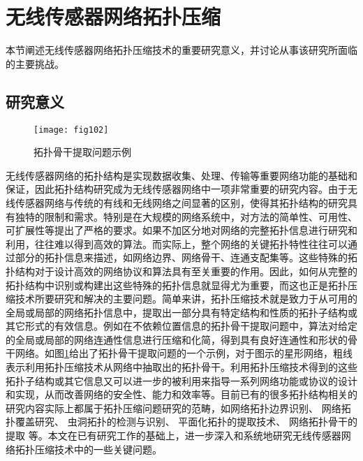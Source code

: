 \section{无线传感器网络拓扑压缩}
本节阐述无线传感器网络拓扑压缩技术的重要研究意义，并讨论从事该研究所面临的主要挑战。
\subsection{研究意义}
\begin{figure}[t]
  \centering
  \texttt{[image: fig102]}
  \caption{拓扑骨干提取问题示例}
  \label{fig:102}
\end{figure}
无线传感器网络的拓扑结构是实现数据收集、处理、传输等重要网络功能的基础和保证，因此拓扑结构研究成为无线传感器网络中一项非常重要的研究内容。由于无线传感器网络与传统的有线和无线网络之间显著的区别，使得其拓扑结构的研究具有独特的限制和需求。特别是在大规模的网络系统中，对方法的简单性、可用性、可扩展性等提出了严格的要求。如果不加区分地对网络的完整拓扑信息进行研究和利用，往往难以得到高效的算法。而实际上，整个网络的关键拓扑特性往往可以通过部分的拓扑信息来描述，如网络边界、网络骨干、连通支配集等。这些特殊的拓扑结构对于设计高效的网络协议和算法具有至关重要的作用。因此，如何从完整的拓扑结构中识别或构建出这些特殊的拓扑信息就显得尤为重要，而这也正是拓扑压缩技术所要研究和解决的主要问题。简单来讲，拓扑压缩技术就是致力于从可用的全局或局部的网络拓扑信息中，提取出一部分具有特定结构和性质的拓扑子结构或其它形式的有效信息。例如在不依赖位置信息的拓扑骨干提取问题中，算法对给定的全局或局部的网络连通性信息进行压缩和化简，得到具有良好连通性和形状的骨干网络。如图\ref{fig:102}给出了拓扑骨干提取问题的一个示例，对于图示的星形网络，粗线表示利用拓扑压缩技术从网络中抽取出的拓扑骨干。利用拓扑压缩技术得到的这些拓扑子结构或其它信息又可以进一步的被利用来指导一系列网络功能或协议的设计和实现，从而改善网络的安全性、能力和效率等。目前已有的很多拓扑结构相关的研究内容实际上都属于拓扑压缩问题研究的范畴，如网络拓扑边界识别、 网络拓扑覆盖研究、 虫洞拓扑的检测与识别、
平面化拓扑的提取技术、 网络拓扑骨干的提取 等。本文在已有研究工作的基础上，进一步深入和系统地研究无线传感器网络拓扑压缩技术中的一些关键问题。

